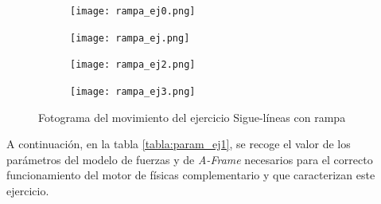 \begin{figure}[h!]
\begin{subfigure}[b]{0.5\textwidth}
    \texttt{[image: rampa\_ej0.png]}
  \end{subfigure}
  \hfill
  \hfill
  \begin{subfigure}[b]{0.5\textwidth}
    \texttt{[image: rampa\_ej.png]}
  \end{subfigure}
    \hfill
    \hfill
  \begin{subfigure}[b]{0.5\textwidth}
    \texttt{[image: rampa\_ej2.png]}
  \end{subfigure}
    \hfill
  \begin{subfigure}[b]{0.5\textwidth}
    \texttt{[image: rampa\_ej3.png]}
  \end{subfigure}
    \caption{Fotograma del movimiento del ejercicio Sigue-líneas con rampa}
    \label{fig:Sigue-líneas con rampa}
\end{figure}

\clearpage

A continuación, en la tabla \ref{tabla:param_ej1}, se recoge el valor de los parámetros del modelo de fuerzas y de  \textit{A-Frame} necesarios para el correcto funcionamiento del motor de físicas complementario y que caracterizan este ejercicio.

